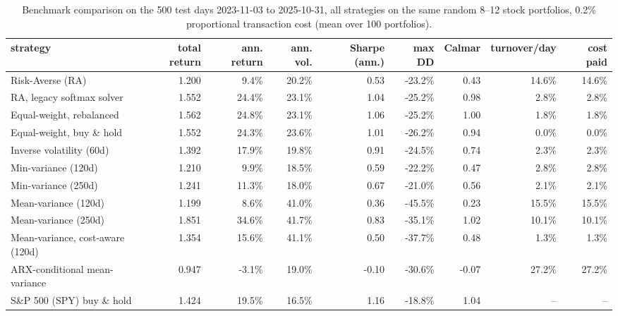 \begin{table}[ht!]
\centering
\footnotesize
\setlength{\tabcolsep}{4pt}
\begin{tabular}{lrrrrrrrr}
\hline
strategy & total return & ann. return & ann. vol. & Sharpe (ann.) & max DD & Calmar & turnover/day & cost paid \\
\hline
Risk-Averse (RA) & 1.200 & 9.4\% & 20.2\% & 0.53 & -23.2\% & 0.43 & 14.6\% & 14.6\% \\
RA, legacy softmax solver & 1.552 & 24.4\% & 23.1\% & 1.04 & -25.2\% & 0.98 & 2.8\% & 2.8\% \\
Equal-weight, rebalanced & 1.562 & 24.8\% & 23.1\% & 1.06 & -25.2\% & 1.00 & 1.8\% & 1.8\% \\
Equal-weight, buy \& hold & 1.552 & 24.3\% & 23.6\% & 1.01 & -26.2\% & 0.94 & 0.0\% & 0.0\% \\
Inverse volatility (60d) & 1.392 & 17.9\% & 19.8\% & 0.91 & -24.5\% & 0.74 & 2.3\% & 2.3\% \\
Min-variance (120d) & 1.210 & 9.9\% & 18.5\% & 0.59 & -22.2\% & 0.47 & 2.8\% & 2.8\% \\
Min-variance (250d) & 1.241 & 11.3\% & 18.0\% & 0.67 & -21.0\% & 0.56 & 2.1\% & 2.1\% \\
Mean-variance (120d) & 1.199 & 8.6\% & 41.0\% & 0.36 & -45.5\% & 0.23 & 15.5\% & 15.5\% \\
Mean-variance (250d) & 1.851 & 34.6\% & 41.7\% & 0.83 & -35.1\% & 1.02 & 10.1\% & 10.1\% \\
Mean-variance, cost-aware (120d) & 1.354 & 15.6\% & 41.1\% & 0.50 & -37.7\% & 0.48 & 1.3\% & 1.3\% \\
ARX-conditional mean-variance & 0.947 & -3.1\% & 19.0\% & -0.10 & -30.6\% & -0.07 & 27.2\% & 27.2\% \\
S\&P 500 (SPY) buy \& hold & 1.424 & 19.5\% & 16.5\% & 1.16 & -18.8\% & 1.04 & -- & -- \\
\hline
\end{tabular}
\caption{Benchmark comparison on the 500 test days 2023-11-03 to 2025-10-31, all strategies on the same random 8--12 stock portfolios, 0.2\% proportional transaction cost (mean over 100 portfolios).}
\label{tab:bench_mean_oos2026}
\end{table}

